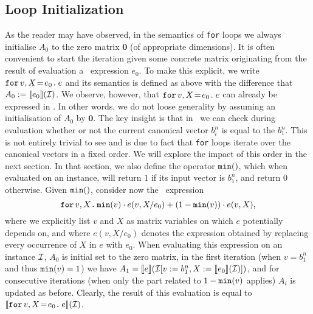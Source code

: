 \subsection{Loop Initialization} As the reader may have observed, in the semantics of \texttt{for} loops we 
always initialise $A_0$ to the zero matrix $\mathbf{0}$ (of appropriate dimensions). It is often convenient
to start the iteration given some concrete matrix  originating from the result of evaluation a \langfor\ expression $e_0$. To make this explicit, we write $\initf{e_0}{v}{X}{e}$ and its semantics is defined as above
with the difference that $A_0:=\sem{e_0}{\I}$. We observe, however, that $\initf{e_0}{v}{X}{e}$ can already
be expressed in \langfor. In other words, we do not loose generality by assuming an initialisation of $A_0$ by $\mathbf{0}$.
The key insight is that in \langfor\ we can check during evaluation whether or not
the current canonical vector $b_i^n$ is equal to the $b_1^n$. This is not entirely trivial to see and is due to fact that \texttt{for} loops iterate over the canonical vectors in a fixed order. We will explore the impact of this order in the next section. In that section, we also define the operator $\mmin$, which when evaluated on an instance, will return $1$ if its input vector is $b_1^n$, and return $0$ otherwise. Given $\mmin$, consider now the
\langfor\ expression
 $$\ffor{v}{X}{\mmin{v}\cdot e(v,X/e_0) + (1-\mmin{v})\cdot e(v,X)},$$
 where we explicitly list $v$ and $X$ as matrix variables on which $e$ potentially depends on, and where
 $e(v,X/e_0)$ denotes the expression obtained by replacing every occurrence of $X$ in $e$ with $e_0$.
%
When evaluating this expression on an instance $\I$, $A_0$ is initial set to the zero matrix, in the first iteration (when  $v=b_1^n$ and thus $\mmin{v}=1$)
we have $A_1=\sem{e}{\I[v:=b_1^n,X:=\sem{e_0}{\I}]}$, and for consecutive iterations (when only the part related to $1-\mmin{v}$ applies) $A_i$ is updated as before. Clearly, the result of this evaluation is equal to
$\sem{\initf{e_0}{v}{X}{e}}{\I}$. 

